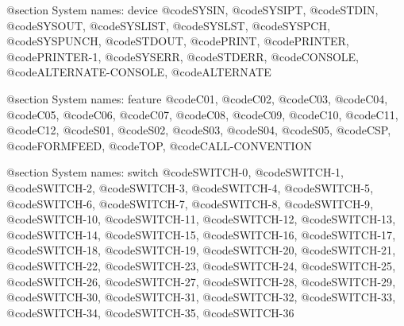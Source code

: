@section System names: device
@code{SYSIN}, @code{SYSIPT}, @code{STDIN}, @code{SYSOUT}, @code{SYSLIST}, @code{SYSLST}, @code{SYSPCH}, @code{SYSPUNCH}, @code{STDOUT}, @code{PRINT}, @code{PRINTER}, @code{PRINTER-1}, @code{SYSERR}, @code{STDERR}, @code{CONSOLE}, @code{ALTERNATE-CONSOLE}, @code{ALTERNATE}

@section System names: feature
@code{C01}, @code{C02}, @code{C03}, @code{C04}, @code{C05}, @code{C06}, @code{C07}, @code{C08}, @code{C09}, @code{C10}, @code{C11}, @code{C12}, @code{S01}, @code{S02}, @code{S03}, @code{S04}, @code{S05}, @code{CSP}, @code{FORMFEED}, @code{TOP}, @code{CALL-CONVENTION}

@section System names: switch
@code{SWITCH-0}, @code{SWITCH-1}, @code{SWITCH-2}, @code{SWITCH-3}, @code{SWITCH-4}, @code{SWITCH-5}, @code{SWITCH-6}, @code{SWITCH-7}, @code{SWITCH-8}, @code{SWITCH-9}, @code{SWITCH-10}, @code{SWITCH-11}, @code{SWITCH-12}, @code{SWITCH-13}, @code{SWITCH-14}, @code{SWITCH-15}, @code{SWITCH-16}, @code{SWITCH-17}, @code{SWITCH-18}, @code{SWITCH-19}, @code{SWITCH-20}, @code{SWITCH-21}, @code{SWITCH-22}, @code{SWITCH-23}, @code{SWITCH-24}, @code{SWITCH-25}, @code{SWITCH-26}, @code{SWITCH-27}, @code{SWITCH-28}, @code{SWITCH-29}, @code{SWITCH-30}, @code{SWITCH-31}, @code{SWITCH-32}, @code{SWITCH-33}, @code{SWITCH-34}, @code{SWITCH-35}, @code{SWITCH-36}


